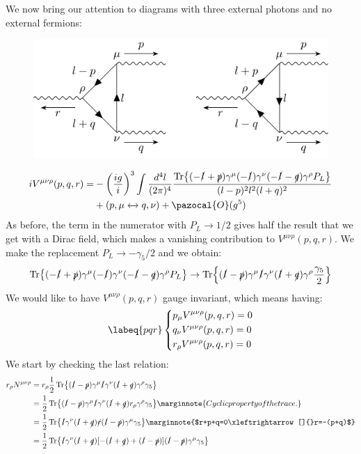 \documentclass[../main.tex]{subfiles}
\begin{document}
We now bring our attention to diagrams with three external photons and no external fermions:
\begin{figure}[h]
    \centering
    \includegraphics{Images/3photons.pdf}
    \caption*{}
\end{figure}
\begin{align*}
iV^{\mu\nu\rho}(p,q,r)=&-\left(\frac{ig}{i}\right)^3\int\frac{d^4l}{(2\pi)^4}\frac{\Tr{(-\slashed{l}+\slashed{p})\gamma^\mu(-\slashed{l})\gamma^\nu(-\slashed{l}-\slashed{q})\gamma^\rho P_L}}{(l-p)^2l^2(l+q)^2}\\
&+(p,\mu\xleftrightarrow[]{}q,\nu)+\pazocal{O}(g^5)
\end{align*}
As before, the term in the numerator with $P_L\to1/2$ gives half the result that we get with a Dirac field, which makes a vanishing contribution to $V^{\mu\nu\rho}(p,q,r)$. We make the replacement $P_L\to-\gamma_5/2$ and we obtain:
\[
\Tr{(-\slashed{l}+\slashed{p})\gamma^\mu(-\slashed{l})\gamma^\nu(-\slashed{l}-\slashed{q})\gamma^\rho P_L}\to\Tr{(\slashed{l}-\slashed{p})\gamma^\mu\slashed{l}\gamma^\nu(\slashed{l}+\slashed{q})\gamma^\rho\frac{\gamma_5}{2}}
\]
We would like to have $V^{\mu\nu\rho}(p,q,r)$ gauge invariant, which means having:
\begin{equation}
\labeq{pqr}
\left\{
\begin{aligned}
&p_\mu V^{\mu\nu\rho}(p,q,r)=0 \\
&q_\nu V^{\mu\nu\rho}(p,q,r)=0 \\
&r_\rho V^{\mu\nu\rho}(p,q,r)=0
\end{aligned}
\right.
\end{equation}
We start by checking the last relation:
\begin{align*}
r_\rho N^{\mu\nu\rho}&=r_\rho\frac{1}{2}\Tr{(\slashed{l}-\slashed{p})\gamma^\mu\slashed{l}\gamma^\nu(\slashed{l}+\slashed{q})\gamma^\rho\gamma_5}\\
&=\frac{1}{2}\Tr{(\slashed{l}-\slashed{p})\gamma^\mu\slashed{l}\gamma^\nu(\slashed{l}+\slashed{q})r_\rho\gamma^\rho\gamma_5}\marginnote{Cyclic property of the trace.}\\
&=\frac{1}{2}\Tr{\slashed{l}\gamma^\nu(\slashed{l}+\slashed{q})\slashed{r}(\slashed{l}-\slashed{p})\gamma^\mu\gamma_5}\marginnote{$r+p+q=0\xleftrightarrow[]{}r=-(p+q)$}\\
&=\frac{1}{2}\Tr{\slashed{l}\gamma^\nu(\slashed{l}+\slashed{q})[-(\slashed{l}+\slashed{q})+(\slashed{l}-\slashed{p})](\slashed{l}-\slashed{p})\gamma^\mu\gamma_5}
\end{align*}
\end{document}
